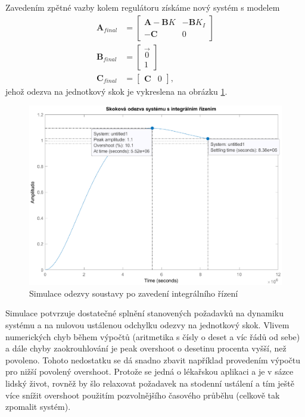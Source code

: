 \documentclass[twoside]{article}
\begin{document}
Zavedením zpětné vazby kolem regulátoru získáme nový systém s modelem
\begin{equation}
	\begin{split}
		\mathbf{A}_{final} &= \begin{bmatrix}
			\mathbf{A}-\mathbf{B}K & -\mathbf{B}K_I \\
			-\mathbf{C} & 0
		\end{bmatrix} \\
		\mathbf{B}_{final} &= \begin{bmatrix}
			\vec{0} \\ 1
		\end{bmatrix} \\
\mathbf{C}_{final} &= \begin{bmatrix}
	\mathbf{C} & 0
\end{bmatrix},
	\end{split}
\end{equation}
jehož odezva na jednotkový skok je vykreslena na obrázku \ref{fig:good_gain}.
\begin{figure}[htbp]
	\centering
	\includegraphics[width=\linewidth]{skokova_po_integraci.eps}
	\caption{Simulace odezvy soustavy po zavedení integrálního řízení}
	\label{fig:good_gain}
\end{figure}

Simulace potvrzuje dostatečné splnění stanovených požadavků na dynamiku systému a na nulovou ustálenou odchylku
odezvy na jednotkový skok. Vlivem numerických chyb během výpočtů (aritmetika s čísly o deset a víc řádů od sebe)
a dále chyby zaokrouhlování je peak overshoot o desetinu procenta vyšší, než povoleno. Tohoto nedostatku se dá
snadno zbavit například provedením výpočtu pro nižší povolený overshoot. Protože se jedná o lékařskou aplikaci a je v sázce
lidský život, rovněž by šlo relaxovat požadavek na stodenní ustálení a tím ještě více snížit overshoot použitím pozvolnějšího
časového průběhu (celkově tak zpomalit systém).
\end{document}
